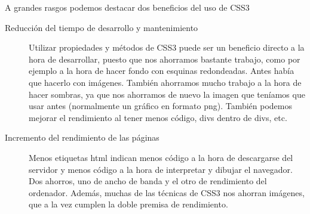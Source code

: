 A grandes rasgos podemos destacar dos beneficios del uso de CSS3
\begin{description}
    \item[Reducción del tiempo de desarrollo y mantenimiento] Utilizar propiedades y métodos de CSS3 puede ser un beneficio directo a la hora
    de desarrollar, puesto que nos ahorramos bastante trabajo, como por ejemplo
    a la hora de hacer fondo con esquinas redondeadas. Antes había que hacerlo
    con imágenes. También ahorramos mucho trabajo a la hora de hacer
    sombras, ya que nos ahorramos de nuevo la imagen que teníamos que usar
    antes (normalmente un gráfico en formato png).
    También podemos mejorar el rendimiento al tener menos código, divs dentro
    de divs, etc.
    \item[Incremento del rendimiento de las páginas] Menos etiquetas html indican menos código a la hora de descargarse del servidor
    y menos código a la hora de interpretar y dibujar el navegador. Dos ahorros,
    uno de ancho de banda y el otro de rendimiento del ordenador. Además,
    muchas de las técnicas de CSS3 nos ahorran imágenes, que a la vez cumplen
    la doble premisa de rendimiento.
\end{description}



